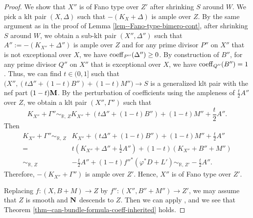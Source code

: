 \documentclass[12pt]{amsart}
\theoremstyle{definition}
\begin{document}
\begin{proof}
We show that $X''$ is of Fano type over $Z'$ after shrinking $S$ around $W$. 
We pick a klt pair $(X,\Delta)$ such that $-(K_{X}+\Delta)$ is ample over $Z$. 
By the same argument as in the proof of Lemma \ref{lem--Fano-type-bimero-cont}, after shrinking $S$ around $W$, we obtain a sub-klt pair $(X'',\Delta'')$ such that $A'':=-(K_{X''}+\Delta'')$ is ample over $Z$ and for any prime divisor $P''$ on $X''$ that is not exceptional over $X$, we have ${\rm coeff}_{P''}(\Delta'') \geq 0$.  
By construction of $B''$, for any prime divisor $Q''$ on $X''$ that is exceptional over $X$, we have ${\rm coeff}_{Q''}(B'')=1$. 
Thus, we can find $t \in (0,1]$ such that $\bigl(X'',(t\Delta''+(1-t)B'')+(1-t)M''\bigr) \to S$ is a generalized klt pair with the nef part $(1-t)\boldsymbol{\rm M}$. 
By the perturbation of coefficients using the ampleness of $\frac{t}{2}A''$ over $Z$, we obtain a klt pair $(X'',\Gamma'')$ such that
$$K_{X''}+\Gamma'' \sim_{\mathbb{R},\,Z}K_{X''}+(t\Delta''+(1-t)B'')+(1-t)M''+\frac{t}{2}A''.$$
Then
\begin{equation*}
\begin{split}
K_{X''}+\Gamma'' \sim_{\mathbb{R},\,Z}&K_{X''}+(t\Delta''+(1-t)B'')+(1-t)M''+\frac{t}{2}A''\\
=&t(K_{X''}+\Delta''+\frac{1}{2}A'')+(1-t)(K_{X''}+B''+M'')\\
\sim_{\mathbb{R},\,Z}&-\frac{t}{2}A''+(1-t)f''^{*}(\varphi^{*}D+L')\sim_{\mathbb{R},\,Z'}-\frac{t}{2}A''.
\end{split}
\end{equation*}
Therefore, $-(K_{X''}+\Gamma'')$ is ample over $Z'$. 
Hence, $X''$ is of Fano type over $Z'$. 

Replacing $f \colon (X,B+M) \to Z$ by $f'' \colon (X'',B''+M'') \to Z'$, we may assume that $Z$ is smooth and $\boldsymbol{\rm N}$ descends to $Z$. 
Then we can apply \cite[Proof of Lemma 5.4]{filipazzi-moraga}, and we see that Theorem \ref{thm--can-bundle-formula-coeff-inherited} holds. 
\end{proof}
\end{document}
